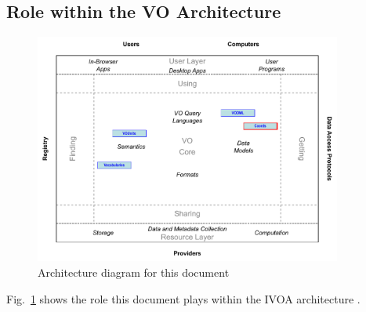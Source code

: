 \documentclass[11pt,a4paper]{ivoa}
\begin{document}
\pagebreak
\subsection{Role within the VO Architecture}

\begin{figure}[h]
\centering


\includegraphics[width=0.9\textwidth]{role_diagram.pdf}
\caption{Architecture diagram for this document}
\label{fig:archdiag}
\end{figure}

Fig.~\ref{fig:archdiag} shows the role this document plays within the
IVOA architecture \citep{2010ivoa.rept.1123A}.



\appendix












\pagebreak

\end{document}
